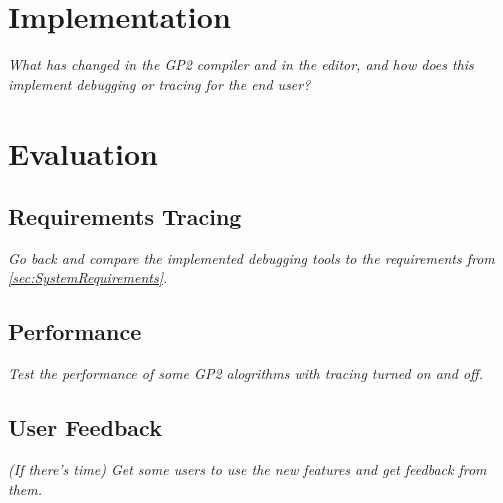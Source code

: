 \documentclass[authoryearcitations]{UoYCSproject}
\begin{document}
\clearpage


\chapter{Implementation}
\label{cha:Implementation}

\emph{What has changed in the GP2 compiler and in the editor, and how does this
implement debugging or tracing for the end user?}

\clearpage


\chapter{Evaluation}
\label{cha:Evaluation}

\section{Requirements Tracing}
\label{sec:RequirementsTracing}

\emph{Go back and compare the implemented debugging tools to the requirements
from \autoref{sec:SystemRequirements}.}


\section{Performance}
\label{sec:Performance}

\emph{Test the performance of some GP2 alogrithms with tracing turned on and off.}


\section{User Feedback}
\label{sec:UserFeedback}

\emph{(If there's time) Get some users to use the new features and get feedback
from them.}

\clearpage

\end{document}
